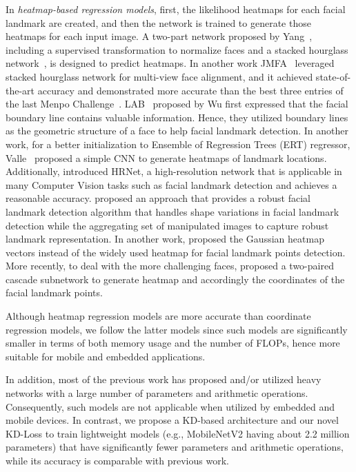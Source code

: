 \documentclass[times,twocolumn,final,authoryear]{elsarticle}
\begin{document}
In \textit{heatmap-based regression models}, first, the likelihood heatmaps for each facial landmark are created, and then the network is trained to generate those heatmaps for each input image. A two-part network proposed by Yang~\cite{yang2017stacked}, including a supervised transformation to normalize faces and a stacked hourglass network~\cite{newell2016stacked}, is designed to predict heatmaps. In another work JMFA~\cite{deng2019joint} leveraged stacked hourglass network for multi-view face alignment, and it achieved state-of-the-art accuracy and demonstrated more accurate than the best three entries of the last Menpo Challenge~\cite{zafeiriou2017menpo}. LAB~\cite{wu2018look} proposed by Wu first expressed that the facial boundary line contains valuable information. Hence, they utilized boundary lines as the geometric structure of a face to help facial landmark detection. In another work, for a better initialization to Ensemble of Regression Trees (ERT) regressor, Valle~\cite{valle2018deeply} proposed a simple CNN to generate heatmaps of landmark locations. Additionally, \cite{sun2019high} introduced HRNet, a high-resolution network that is applicable in many Computer Vision tasks such as facial landmark detection and achieves a reasonable accuracy. \cite{iranmanesh2020robust} proposed an approach that provides a robust facial landmark detection algorithm that handles shape variations in facial landmark detection while the aggregating set of manipulated images to capture robust landmark representation. In another work, \cite{xiong2020gaussian} proposed the Gaussian heatmap vectors instead of the widely used heatmap for facial landmark points detection. More recently, to deal with the more challenging faces, \cite{mahpod2021facial} proposed a two-paired cascade subnetwork to generate heatmap and accordingly the coordinates of the facial landmark points.

Although heatmap regression models are more accurate than coordinate regression models, we follow the latter models since such models are significantly smaller in terms of both memory usage and the number of FLOPs, hence more suitable for mobile and embedded applications.

In addition, most of the previous work has proposed and/or utilized heavy networks with a large number of parameters and arithmetic operations. Consequently, such models are not applicable when utilized by embedded and mobile devices. In contrast, we propose a KD-based architecture and our novel KD-Loss to train lightweight models (e.g., MobileNetV2 having about 2.2 million parameters) that have significantly fewer parameters and arithmetic operations, while its accuracy is comparable with previous work. 
\end{document}
